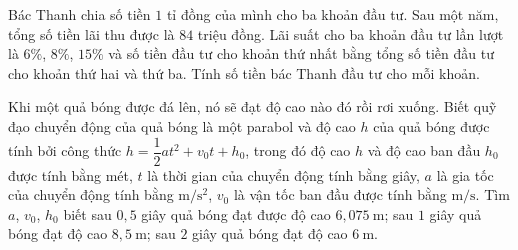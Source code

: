 \begin{bt}
	Bác Thanh chia số tiền $1$ tỉ đồng của mình cho ba khoản đầu tư. Sau một năm, tổng số tiền lãi thu được là $84$ triệu đồng. Lãi suất cho ba khoản đầu tư lần lượt là $6\%$, $8\%$, $15\%$ và số tiền đầu tư cho khoản thứ nhất bằng tổng số tiền đầu tư cho khoản thứ hai và thứ ba. Tính số tiền bác Thanh đầu tư cho mỗi khoản.
\end{bt}

\begin{bt}
	Khi một quả bóng được đá lên, nó sẽ đạt độ cao nào đó rồi rơi xuống. Biết quỹ đạo chuyển động của quả bóng là một parabol và độ cao $h$ của quả bóng được tính bởi công thức $h=\dfrac{1}{2}at^{2}+v_{0}t+h_{0}$, trong đó độ cao $h$ và độ cao ban đầu $h_{0}$ được tính bằng mét, $t$ là thời gian của chuyển động tính bằng giây, $a$ là gia tốc của chuyển động tính bằng $\mathrm{m}/\mathrm{s}^{2}$, $v_{0}$ là vận tốc ban đầu được tính bằng $\mathrm{m}/\mathrm{s}$. Tìm $a$, $v_{0}$, $h_{0}$ biết sau $0,5$ giây quả bóng đạt được độ cao $6,075 \mathrm{~m}$; sau $1$ giây quả bóng đạt độ cao $8,5 \mathrm{~m}$; sau $2$ giây quả bóng đạt độ cao $6\mathrm{~m}$.
\end{bt}

